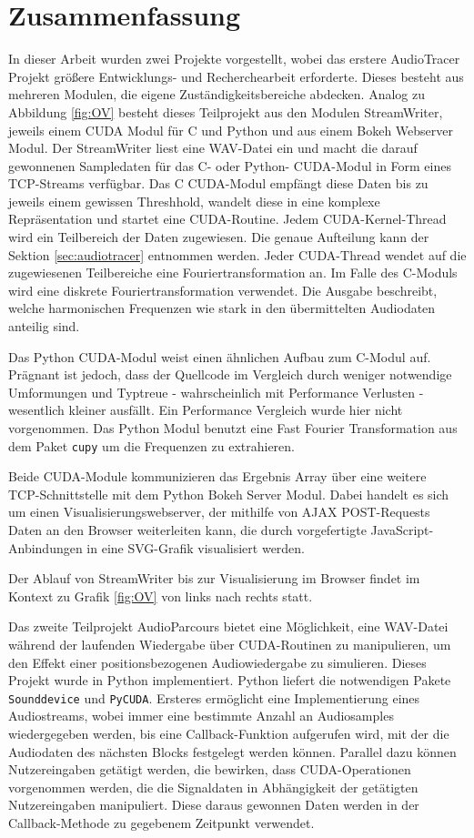 
\section{Zusammenfassung}

In dieser Arbeit wurden zwei Projekte vorgestellt, wobei das erstere AudioTracer Projekt größere Entwicklungs- und Recherchearbeit erforderte. Dieses besteht aus mehreren Modulen, die eigene Zuständigkeitsbereiche abdecken. Analog zu Abbildung \ref{fig:OV} besteht dieses Teilprojekt aus den Modulen StreamWriter, jeweils einem CUDA Modul für C und Python und aus einem Bokeh Webserver Modul. Der StreamWriter liest eine WAV-Datei ein und macht die darauf gewonnenen Sampledaten für das C- oder Python- CUDA-Modul in Form eines TCP-Streams verfügbar. Das C CUDA-Modul empfängt diese Daten bis zu jeweils einem gewissen Threshhold, wandelt diese in eine komplexe Repräsentation und startet eine CUDA-Routine. Jedem CUDA-Kernel-Thread wird ein Teilbereich der Daten zugewiesen. Die genaue Aufteilung kann der Sektion \ref{sec:audiotracer} entnommen werden. Jeder CUDA-Thread wendet auf die zugewiesenen Teilbereiche eine Fouriertransformation an. Im Falle des C-Moduls wird eine diskrete Fouriertransformation verwendet. Die Ausgabe beschreibt, welche harmonischen Frequenzen wie stark in den übermittelten Audiodaten anteilig sind.

Das Python CUDA-Modul weist einen ähnlichen Aufbau zum C-Modul auf. Prägnant ist jedoch, dass der Quellcode im Vergleich durch weniger notwendige Umformungen und Typtreue - wahrscheinlich mit Performance Verlusten - wesentlich kleiner ausfällt. Ein Performance Vergleich wurde hier nicht vorgenommen. Das Python Modul benutzt eine Fast Fourier Transformation aus dem Paket \texttt{cupy} um die Frequenzen zu extrahieren.

Beide CUDA-Module kommunizieren das Ergebnis Array über eine weitere \\TCP-Schnittstelle mit dem Python Bokeh Server Modul. Dabei handelt es sich um einen Visualisierungswebserver, der mithilfe von AJAX POST-Requests Daten an den Browser weiterleiten kann, die durch vorgefertigte JavaScript-Anbindungen in eine SVG-Grafik visualisiert werden.

Der Ablauf von StreamWriter bis zur Visualisierung im Browser findet im Kontext zu Grafik \ref{fig:OV} von links nach rechts statt.

Das zweite Teilprojekt AudioParcours bietet eine Möglichkeit, eine WAV-Datei während der laufenden Wiedergabe über CUDA-Routinen zu manipulieren, um den Effekt einer positionsbezogenen Audiowiedergabe zu simulieren. Dieses Projekt wurde in Python implementiert. Python liefert die notwendigen Pakete \texttt{Sounddevice} und \texttt{PyCUDA}. Ersteres ermöglicht eine Implementierung eines Audiostreams, wobei immer eine bestimmte Anzahl an Audiosamples wiedergegeben werden, bis eine Callback-Funktion aufgerufen wird, mit der die Audiodaten des nächsten Blocks festgelegt werden können. Parallel dazu können Nutzereingaben getätigt werden, die bewirken, dass CUDA-Operationen vorgenommen werden, die die Signaldaten in Abhängigkeit der getätigten Nutzereingaben manipuliert. Diese daraus gewonnen Daten werden in der Callback-Methode zu gegebenem Zeitpunkt verwendet. 